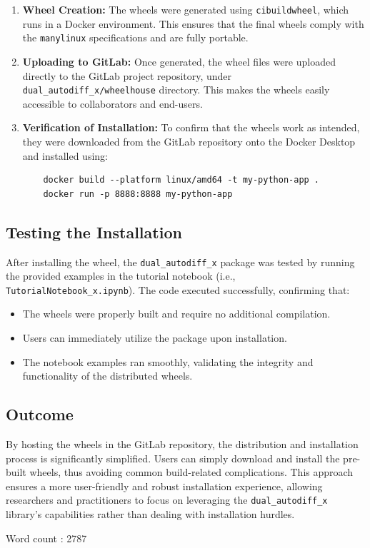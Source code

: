 \documentclass[12.5pt]{article}
\begin{document}
\begin{enumerate}
    \item \textbf{Wheel Creation:} The wheels were generated using \texttt{cibuildwheel}, which runs in a Docker environment. This ensures that the final wheels comply with the \texttt{manylinux} specifications and are fully portable.
    
    \item \textbf{Uploading to GitLab:} Once generated, the wheel files were uploaded directly to the GitLab project repository, under \texttt{dual\_autodiff\_x/wheelhouse} directory. This makes the wheels easily accessible to collaborators and end-users.
    
    \item \textbf{Verification of Installation:} To confirm that the wheels work as intended, they were downloaded from the GitLab repository onto the Docker Desktop and installed using:
    \begin{verbatim}
    docker build --platform linux/amd64 -t my-python-app .
    docker run -p 8888:8888 my-python-app      
    \end{verbatim}
\end{enumerate}

\subsection{Testing the Installation}

After installing the wheel, the \texttt{dual\_autodiff\_x} package was tested by running the provided examples in the tutorial notebook (i.e., \texttt{TutorialNotebook\_x.ipynb}). The code executed successfully, confirming that:

\begin{itemize}
    \item The wheels were properly built and require no additional compilation.
    \item Users can immediately utilize the package upon installation.
    \item The notebook examples ran smoothly, validating the integrity and functionality of the distributed wheels.
\end{itemize}

\subsection{Outcome}

By hosting the wheels in the GitLab repository, the distribution and installation process is significantly simplified. Users can simply download and install the pre-built wheels, thus avoiding common build-related complications. This approach ensures a more user-friendly and robust installation experience, allowing researchers and practitioners to focus on leveraging the \texttt{dual\_autodiff\_x} library’s capabilities rather than dealing with installation hurdles.






Word count : 2787
\end{document}
